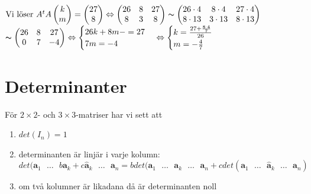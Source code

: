 \begin{center}
    $\text{Vi löser }A^{t}A
    \begin{pmatrix}
        k\\
        m
    \end{pmatrix}=
    \begin{pmatrix}
        27\\
        8
    \end{pmatrix}
    \Leftrightarrow
    \begin{pmatrix}
        26&8&27\\
        8&3&8
    \end{pmatrix}
    \thicksim
    \begin{pmatrix}
        26\cdot 4&8\cdot 4&27\cdot 4\\
        8\cdot 13&3\cdot 13&8\cdot 13
    \end{pmatrix}$\\
    $\thicksim
    \begin{pmatrix}
        26&8&27\\
        0&7&-4
    \end{pmatrix}
    \Leftrightarrow
    \begin{cases}
        26k+8m-=27\\
        7m=-4
    \end{cases}
    \Leftrightarrow
    \begin{cases}
        k=\frac{27+\frac{8\cdot4}{7}}{26}\\
        m=-\frac{4}{7}
    \end{cases}
    $
\end{center}

\chapter{Determinanter}
För $2\times 2$- och $3\times 3$-matriser har vi sett att
\begin{enumerate}
    \item $det(I_{n})=1$
    \item determinanten är linjär i varje kolumn:
        \begin{equation*}
            det(\bm{a}_{1}\text{ }\ldots\text{ }b\bm{a}_{k}+c\widehat{\bm{a}}_{k}\text{ }\ldots\text{ }\bm{a}_{n}=
            bdet(\bm{a}_{1}\text{ }\ldots\text{ }\bm{a}_{k}\text{ }\ldots\text{ }\bm{a}_{n}+
            cdet(\bm{a}_{1}\text{ }\ldots\text{ }\widehat{\bm{a}}_{k}\text{ }\ldots\text{ }\bm{a}_{n})
        \end{equation*}
    \item om två kolumner är likadana då är determinanten noll
\end{enumerate}

